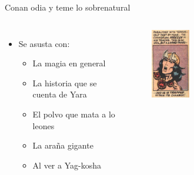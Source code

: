 \begin{frame}{Conan odia y teme lo sobrenatural}
\begin{columns}
 \begin{itemize}
    \item Se asusta con:
    \begin{itemize}
      \item La magia en general
      \item La historia que se cuenta de Yara
      \item El polvo que mata a lo leones
      \item La araña gigante
      \item Al ver a Yag-kosha
    \end{itemize}
 \end{itemize}
 \begin{figure}[htb]
    \centering
    \includegraphics[width=0.3\textwidth]{img/tropes/temor}
 \end{figure}
 \end{columns}
\end{frame}
\note{

}

